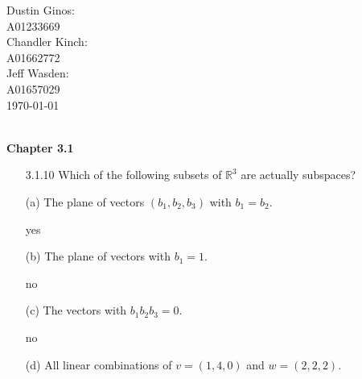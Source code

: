 \documentclass[10pt,twoside,reqno]{article}
\begin{document}
\begin{flushright}
\begin{minipage}{.25\textwidth}
Dustin Ginos: \\
A01233669\\
Chandler Kinch: \\
A01662772\\
Jeff Wasden: \\
A01657029\\

\today
\end{minipage}
\end{flushright}

\\
\vspace{5mm}
\textbf{Chapter 3.1}
\begin{enumerate}
\item[3.1.10] Which of the following subsets of ${\mathbb R}^3$ are actually subspaces? \\ \vspace{1mm}
{\addtolength{\leftskip}{5mm}
(a) The plane of vectors $(b_1, b_2 , b_3)$ with $b_1 = b_2$. \\ \vspace{1mm}
\vspace{3mm}

yes\\
\vspace{3mm}

(b) The plane of vectors with $b_1 = 1$. \\ \vspace{1mm}
\vspace{3mm}

no\\
\vspace{3mm}

(c) The vectors with $b_1b_2b_3 = 0$. \\ \vspace{1mm}
\vspace{3mm}

no\\
\vspace{3mm}

(d) All linear combinations of $v = (1,4,0)$ and $w = (2,2,2)$. \\ \vspace{1mm}
\vspace{3mm}

}
\end{enumerate}
\end{document}
